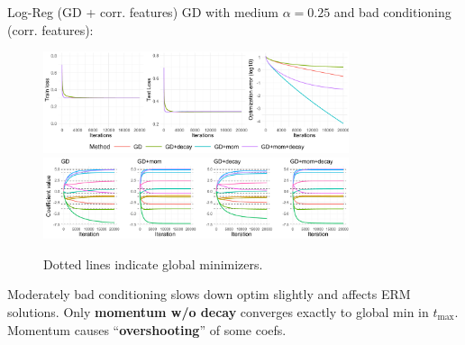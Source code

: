 \documentclass[11pt,compress,t,notes=noshow, xcolor=table]{beamer}
\begin{document}
\begin{vbframe}{Log-Reg (GD + corr. features)}
\vspace{-0.4cm}
GD with medium $\alpha=0.25$ and bad conditioning (corr. features):
\begin{figure}
            \includegraphics[width=0.8\textwidth]{figure_man/simu_linmod/GD_log_med_lr_corr_iters.pdf} \\
             \includegraphics[width=0.8\textwidth]{figure_man/simu_linmod/GD_log_coef_med_corr.pdf}\\
            \begin{footnotesize}
            Dotted lines indicate global minimizers.
            \end{footnotesize}
\end{figure}
\vspace{-0.2cm}
Moderately bad conditioning slows down optim slightly and affects ERM solutions. Only \textbf{momentum w/o decay} converges exactly to global min in $t_{\text{max}}$. Momentum causes “\textbf{overshooting}” of some coefs.
\end{vbframe}
\end{document}
